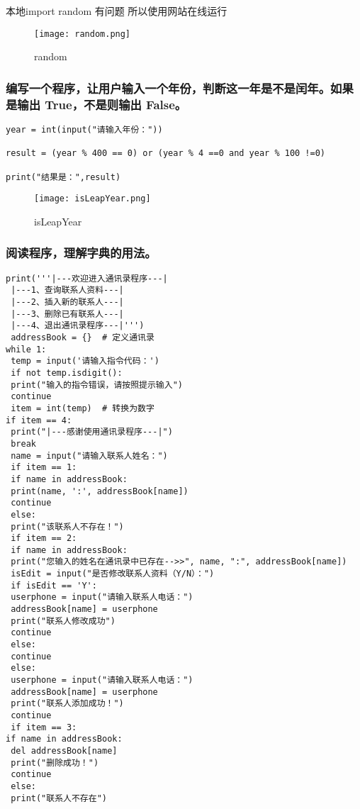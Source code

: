 \documentclass{ctexart}
\begin{document}
本地import random 有问题 所以使用网站在线运行
\begin{figure}[H]
    \centering
    \texttt{[image: random.png]}
    \caption{random}
    \label{fig:enter-label}
\end{figure}



\subsubsection{编写一个程序，让用户输入一个年份，判断这一年是不是闰年。如果是输出 True，不是则输出 False。}
\begin{lstlisting}
year = int(input("请输入年份："))

result = (year % 400 == 0) or (year % 4 ==0 and year % 100 !=0)

print("结果是：",result)
\end{lstlisting}
\begin{figure}[H]
    \centering
    \texttt{[image: isLeapYear.png]}
    \caption{isLeapYear}
    \label{fig:enter-label}
\end{figure}

\subsubsection{阅读程序，理解字典的用法。}
\begin{lstlisting}
print('''|---欢迎进入通讯录程序---|
 |---1、查询联系人资料---|
 |---2、插入新的联系人---|
 |---3、删除已有联系人---|
 |---4、退出通讯录程序---|''')
 addressBook = {}  # 定义通讯录
while 1:
 temp = input('请输入指令代码：')
 if not temp.isdigit():
 print("输入的指令错误，请按照提示输入")
 continue
 item = int(temp)  # 转换为数字
if item == 4:
 print("|---感谢使用通讯录程序---|")
 break
 name = input("请输入联系人姓名：")
 if item == 1:
 if name in addressBook:
 print(name, ':', addressBook[name])
 continue
 else:
 print("该联系人不存在！")
 if item == 2:
 if name in addressBook:
 print("您输入的姓名在通讯录中已存在-->>", name, ":", addressBook[name])
 isEdit = input("是否修改联系人资料（Y/N）：")
 if isEdit == 'Y':
 userphone = input("请输入联系人电话：")
 addressBook[name] = userphone
 print("联系人修改成功")
 continue
 else:
 continue
 else:
 userphone = input("请输入联系人电话：")
 addressBook[name] = userphone
 print("联系人添加成功！")
 continue
 if item == 3:
if name in addressBook:
 del addressBook[name]
 print("删除成功！")
 continue
 else:
 print("联系人不存在")
\end{lstlisting}
\end{document}
